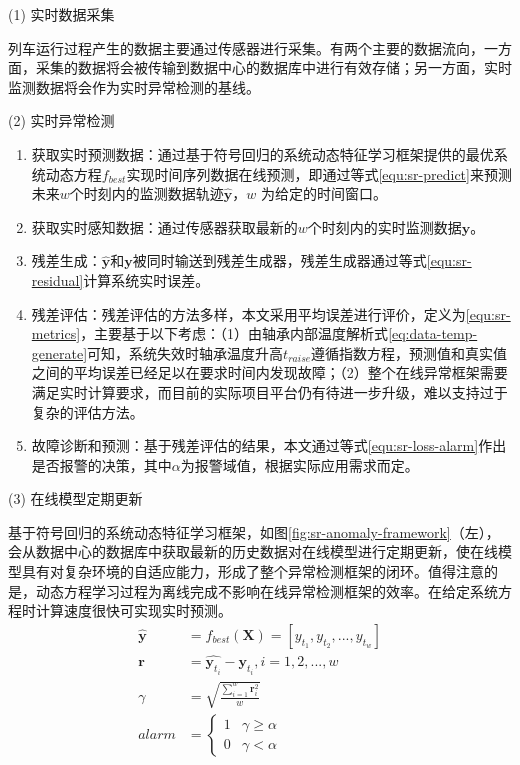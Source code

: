 (1) 实时数据采集

列车运行过程产生的数据主要通过传感器进行采集。有两个主要的数据流向，一方面，采集的数据将会被传输到数据中心的数据库中进行有效存储；另一方面，实时监测数据将会作为实时异常检测的基线。

(2) 实时异常检测
\begin{enumerate}[1.]
    \item 获取实时预测数据：通过基于符号回归的系统动态特征学习框架提供的最优系统动态方程$f_{best}$实现时间序列数据在线预测，即通过等式\ref{equ:sr-predict}来预测未来$w$个时刻内的监测数据轨迹$\mathbf{\hat{y}}$，$w$ 为给定的时间窗口。
    \item 获取实时感知数据：通过传感器获取最新的$w$个时刻内的实时监测数据$\mathbf{y}$。
    \item 残差生成：$\mathbf{\hat{y}}$和$\mathbf{y}$被同时输送到残差生成器，残差生成器通过等式\ref{equ:sr-residual}计算系统实时误差。
    \item 残差评估：残差评估的方法多样，本文采用平均误差进行评价，定义为\ref{equ:sr-metrics}，主要基于以下考虑：（1）由轴承内部温度解析式\ref{eq:data-temp-generate}可知，系统失效时轴承温度升高$t_{raise}$遵循指数方程，预测值和真实值之间的平均误差已经足以在要求时间内发现故障；（2）整个在线异常框架需要满足实时计算要求，而目前的实际项目平台仍有待进一步升级，难以支持过于复杂的评估方法。
    \item 故障诊断和预测：基于残差评估的结果，本文通过等式\ref{equ:sr-loss-alarm}作出是否报警的决策，其中$\alpha$为报警域值，根据实际应用需求而定。
\end{enumerate}

(3) 在线模型定期更新

基于符号回归的系统动态特征学习框架，如图\ref{fig:sr-anomaly-framework}（左），会从数据中心的数据库中获取最新的历史数据对在线模型进行定期更新，使在线模型具有对复杂环境的自适应能力，形成了整个异常检测框架的闭环。值得注意的是，动态方程学习过程为离线完成不影响在线异常检测框架的效率。在给定系统方程时计算速度很快可实现实时预测。
\begin{subequations}
\begin{align}
\mathbf{\hat{y}} &= f_{best}(\mathbf{X}) = [y_{t_{1}}, y_{t_{2}}, ..., y_{t_{w}}] \label{equ:sr-predict}\\
\mathbf{r} &= \hat{\mathbf{y}_{t_{i}}} - \mathbf{y}_{t_{i}}, i=1,2,...,w \label{equ:sr-residual} \\
\gamma  &= \sqrt{\frac{\sum_{i=1}^{w} \mathbf{r}_{i}^{2}}{w} } \label{equ:sr-metrics} \\
alarm &= \begin{cases}
 1 &  \gamma \geqslant \alpha   \\ 
 0 &   \gamma  < \alpha
\end{cases} \label{equ:sr-loss-alarm}
\end{align}
\end{subequations}


